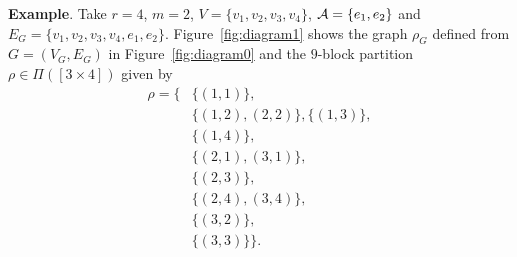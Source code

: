 \documentclass[12pt]{article}
\numberwithin{equation}{section}
\begin{document}
\noindent
{\bf Example}. 
Take $r=4$, $m=2$, $V = \{v_1, v_2, v_3 ,v_4\}$, ${\cal A} = \{e_1,e_2\}$
and $E_G=\{v_1, v_2,v_3,v_4,e_1,e_2\}$. 
 Figure~\ref{fig:diagram1} 
 shows the graph %
 $\rho_G$ defined from $G=(V_G,E_G)$ in Figure~\ref{fig:diagram0}
 and the $9$-block partition $\rho \in \Pi ( [3\times 4])$
 given by 
 \begin{align*}
   \rho = \big\{ & \{(1,1)\},
   \\
   & \{(1,2),(2,2)\},\{(1,3)\},
   \\
   & \{(1,4)\},
   \\
   & \{(2,1),(3,1)\},
   \\
   & \{(2,3)\},
   \\
   & \{(2,4),(3,4)\},
   \\
   & \{(3,2)\},
   \\
   & \{(3,3)\}\big\}. 
\end{align*} 
 
\end{document}
